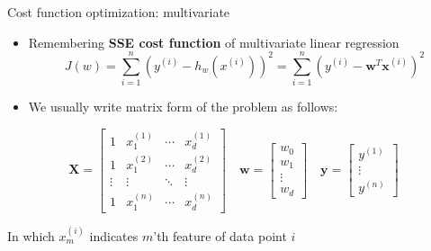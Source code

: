 \documentclass[serif, aspectratio=169]{beamer}
\begin{document}
    \begin{frame}{Cost function optimization: multivariate}
        \begin{itemize}
            \item Remembering \textbf{SSE cost function} of multivariate linear regression
            \[
                J(w) = \sum_{i=1}^{n} \left( y^{(i)} - h_w(x^{(i)}) \right)^2 = \sum_{i=1}^{n} \left( y^{(i)} - \mathbf{w}^T \mathbf{x}^{(i)} \right)^2
            \]
            \item We usually write matrix form of the problem as follows:

        \end{itemize}

        \[
            \mathbf{X} =
            \begin{bmatrix}
                1 & x_1^{(1)} & \cdots & x_d^{(1)} \\
                1 & x_1^{(2)} & \cdots & x_d^{(2)} \\
                \vdots & \vdots & \ddots & \vdots \\
                1 & x_1^{(n)} & \cdots & x_d^{(n)}
            \end{bmatrix}
            \quad
            \mathbf{w} =
            \begin{bmatrix}
                w_0 \\
                w_1 \\
                \vdots \\
                w_d
            \end{bmatrix}
            \quad
            \mathbf{y} =
            \begin{bmatrix}
                y^{(1)} \\
                \vdots \\
                y^{(n)}
            \end{bmatrix}
        \]

        \begin{center}
            In which \( x_m^{(i)} \) indicates \(m \)'th feature of data point \( i\) \\
        \end{center}

    \end{frame}
\end{document}
